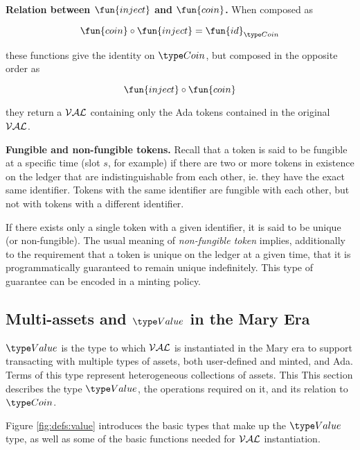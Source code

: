 \textbf{Relation between $\fun{inject}$ and $\fun{coin}$.}
When composed as

\[\fun{coin} \circ \fun{inject} = \fun{id}_{\Coin}\]

these functions give the identity on $\Coin$, but composed in the opposite order as

\[\fun{inject} \circ \fun{coin}\]

they return a $\mathcal{VAL}$ containing only the Ada tokens contained in the original $\mathcal{VAL}$.

\textbf{Fungible and non-fungible tokens.}
Recall that a token is said to be fungible at a specific time (slot $s$, for example) if
there are two or more tokens in existence on the ledger that are indistinguishable from
each other, ie. they have the exact same identifier. Tokens with the same
identifier are fungible with each other, but not with tokens with a different identifier.

If there exists only a single
token with a given identifier, it is said to be unique (or non-fungible).
The usual meaning of \emph{non-fungible token} implies, additionally to the
requirement that a token is unique on the ledger at a given time, that
it is programmatically guaranteed to remain unique indefinitely. This
type of guarantee can be encoded in a minting policy.


\subsection{Multi-assets and $\Value$ in the Mary Era}

$\Value$ is the type to which
$\mathcal{VAL}$ is instantiated in the Mary era to support transacting with
multiple types of assets, both user-defined and minted, and Ada. Terms of this
type represent heterogeneous collections of assets. This
This section describes the type $\Value$, the operations required on
it, and its relation to $\Coin$.

Figure \ref{fig:defs:value} introduces the basic types that make up the $\Value$ type,
as well as some of the basic functions needed for $\mathcal{VAL}$ instantiation.

